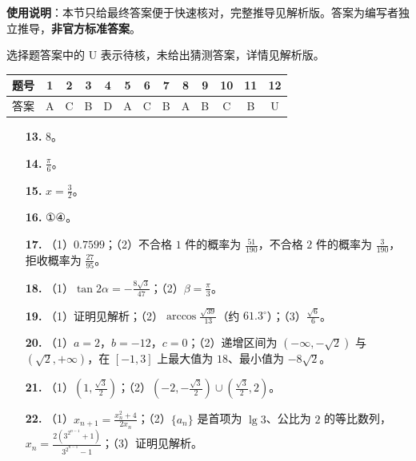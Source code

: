 
\begin{gknotice}
\textbf{使用说明}：本节只给最终答案便于快速核对，完整推导见解析版。答案为编写者独立推导，\textbf{非官方标准答案}。
\end{gknotice}

\begin{gknotice}
选择题答案中的 U 表示待核，未给出猜测答案，详情见解析版。
\end{gknotice}

\begin{center}\begin{tabular}{ccccccccccccc}
\toprule
题号 & 1 & 2 & 3 & 4 & 5 & 6 & 7 & 8 & 9 & 10 & 11 & 12 \\
\midrule
答案 & A & C & B & D & A & C & B & A & B & C & B & U \\
\bottomrule
\end{tabular}\end{center}

\begin{itemize}[leftmargin=2.6em]
  \item[\textbf{13.}] $8$。
  \item[\textbf{14.}] $\frac{\pi}{6}$。
  \item[\textbf{15.}] $x=\frac32$。
  \item[\textbf{16.}] ①④。
\end{itemize}

\begin{itemize}[leftmargin=2.6em]
  \item[\textbf{17.}] （1）$0.7599$；（2）不合格 $1$ 件的概率为 $\frac{51}{190}$，不合格 $2$ 件的概率为 $\frac{3}{190}$，拒收概率为 $\frac{27}{95}$。
  \item[\textbf{18.}] （1）$\tan2\alpha=-\frac{8\sqrt3}{47}$；（2）$\beta=\frac{\pi}{3}$。
  \item[\textbf{19.}] （1）证明见解析；（2）$\arccos\frac{\sqrt{39}}{13}$（约 $61.3^\circ$）；（3）$\frac{\sqrt6}{6}$。
  \item[\textbf{20.}] （1）$a=2$，$b=-12$，$c=0$；（2）递增区间为 $(-\infty,-\sqrt2)$ 与 $(\sqrt2,+\infty)$，在 $[-1,3]$ 上最大值为 $18$、最小值为 $-8\sqrt2$。
  \item[\textbf{21.}] （1）$\left(1,\frac{\sqrt3}{2}\right)$；（2）$\left(-2,-\frac{\sqrt3}{2}\right)\cup\left(\frac{\sqrt3}{2},2\right)$。
  \item[\textbf{22.}] （1）$x_{n+1}=\frac{x_n^2+4}{2x_n}$；（2）$\{a_n\}$ 是首项为 $\lg3$、公比为 $2$ 的等比数列，$x_n=\frac{2\left(3^{2^{n-1}}+1\right)}{3^{2^{n-1}}-1}$；（3）证明见解析。
\end{itemize}
